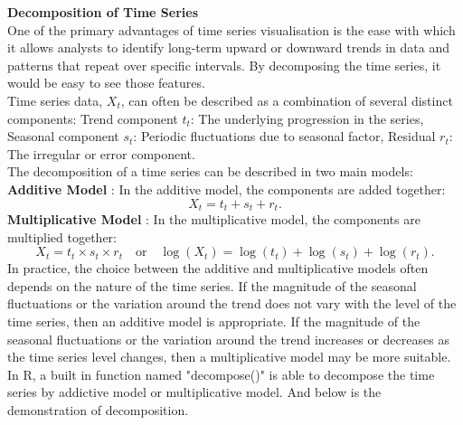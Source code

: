 \documentclass{article}\usepackage[]{graphicx}\usepackage[]{xcolor}
\begin{document}
\noindent
\textbf{Decomposition of Time Series}\\
\noindent
One of the primary advantages of time series visualisation is the ease with which it allows analysts to identify long-term upward or downward trends in data and patterns that repeat over specific intervals. By decomposing the time series, it would be easy to see those features.\\

\noindent
Time series data, $X_t$, can often be described as a combination of several distinct components: Trend component $t_t$: The underlying progression in the series, Seasonal component $s_t$: Periodic fluctuations due to seasonal factor, Residual $r_t$: The irregular or error component.\\

\noindent
The decomposition of a time series can be described in two main models:\\
\textbf{Additive Model} \cite{Brockwell2016Introduction}: In the additive model, the components are added together:
\[
X_t = t_t + s_t + r_t.
\]
\textbf{Multiplicative Model} \cite{Brockwell2016Introduction}: In the multiplicative model, the components are multiplied together:
\[
X_t = t_t \times s_t \times r_t \quad \text{or} \quad \log(X_t) = \log(t_t) + \log(s_t) + \log(r_t).
\]
In practice, the choice between the additive and multiplicative models often depends on the nature of the time series. If the magnitude of the seasonal fluctuations or the variation around the trend does not vary with the level of the time series, then an additive model is appropriate. If the magnitude of the seasonal fluctuations or the variation around the trend increases or decreases as the time series level changes, then a multiplicative model may be more suitable.\\

\noindent
In R, a built in function named "decompose()" is able to decompose the time series by addictive model or multiplicative model. And below is the demonstration of decomposition.
\end{document}
